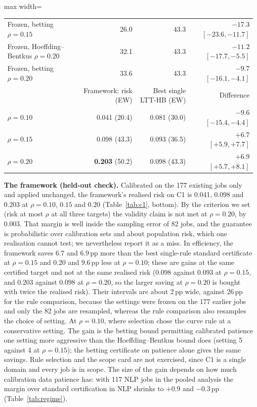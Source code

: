 \documentclass[3p,twocolumn,10pt]{elsarticle}
\theoremstyle{definition}
\begin{document}
\begin{table}[t]
\begin{adjustbox}{max width=\textwidth}
\begin{tabular}{lrrr}
Frozen, betting $\rho=0.15$ & 26.0 & 43.3 & $-17.3$ $[-23.6,-11.7]$ \\
Frozen, Hoeffding--Bentkus $\rho=0.20$ & 32.1 & 43.3 & $-11.2$ $[-17.7,-5.5]$ \\
Frozen, betting $\rho=0.20$ & 33.6 & 43.3 & $-9.7$ $[-16.1,-4.1]$ \\
\midrule
 & Framework: risk (EW) & Best single LTT-HB (EW) & Difference \\
\midrule
$\rho=0.10$ & 0.041 (20.4) & 0.081 (30.0) & $-9.6$ $[-15.4,-4.4]$ \\
$\rho=0.15$ & 0.098 (43.3) & 0.093 (36.5) & $+6.7$ $[+5.9,+7.7]$ \\
$\rho=0.20$ & \textbf{0.203} (50.2) & 0.098 (43.3) & $+6.9$ $[+5.7,+8.1]$ \\
\bottomrule
\end{tabular}
\end{adjustbox}
\end{table}

\textbf{The framework (held-out check).} Calibrated on the 177 existing jobs only and applied unchanged, the framework's realised risk on C1 is 0.041, 0.098 and 0.203 at $\rho=0.10$, $0.15$ and $0.20$ (Table~\ref{tab:c1}, bottom). By the criterion we set (risk at most $\rho$ at all three targets) the validity claim is not met at $\rho=0.20$, by 0.003. That margin is well inside the sampling error of 82 jobs, and the guarantee is probabilistic over calibration sets and about population risk, which one realisation cannot test; we nevertheless report it as a miss. In efficiency, the framework saves 6.7 and 6.9\,pp more than the best single-rule standard certificate at $\rho=0.15$ and $0.20$ and 9.6\,pp less at $\rho=0.10$; these are gains at the same certified target and not at the same realised risk (0.098 against 0.093 at $\rho=0.15$, and 0.203 against 0.098 at $\rho=0.20$, so the larger saving at $\rho=0.20$ is bought with twice the realised risk). Their intervals are about 2\,pp wide, against 26\,pp for the rule comparison, because the settings were frozen on the 177 earlier jobs and only the 82 jobs are resampled, whereas the rule comparison also resamples the choice of setting. At $\rho=0.10$, where selection chose the curve rule at a conservative setting. The gain is the betting bound permitting calibrated patience one setting more aggressive than the Hoeffding--Bentkus bound does (setting 5 against 4 at $\rho=0.15$); the betting certificate on patience alone gives the same savings. Rule selection and the scope card are not exercised, since C1 is a single domain and every job is in scope. The size of the gain depends on how much calibration data patience has: with 117 NLP jobs in the pooled analysis the margin over standard certification in NLP shrinks to $+0.9$ and $-0.3$\,pp (Table~\ref{tab:regime}).
\end{document}
